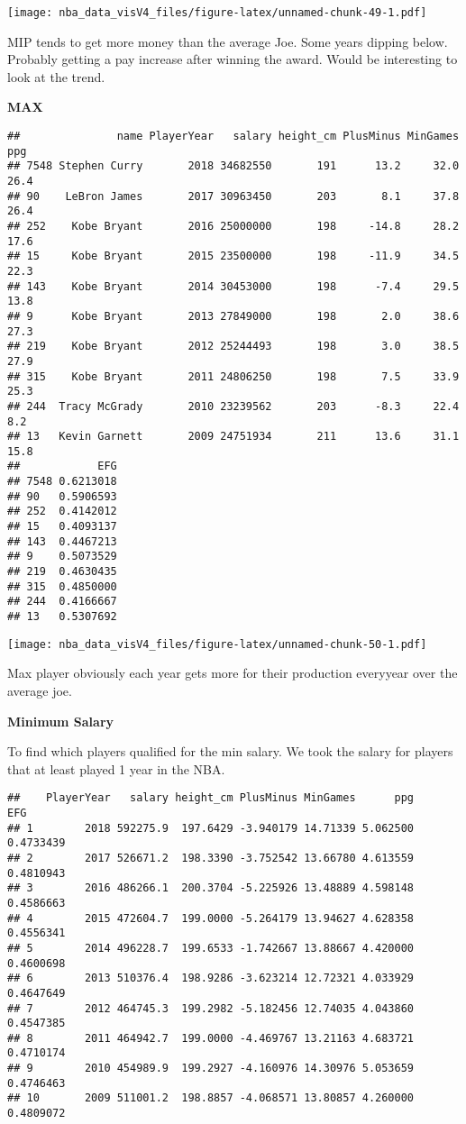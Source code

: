 \documentclass[]{article}
\begin{document}
\texttt{[image: nba\_data\_visV4\_files/figure-latex/unnamed-chunk-49-1.pdf]}

MIP tends to get more money than the average Joe. Some years dipping
below. Probably getting a pay increase after winning the award. Would be
interesting to look at the trend.

\textbf{MAX}

\begin{verbatim}
##               name PlayerYear   salary height_cm PlusMinus MinGames  ppg
## 7548 Stephen Curry       2018 34682550       191      13.2     32.0 26.4
## 90    LeBron James       2017 30963450       203       8.1     37.8 26.4
## 252    Kobe Bryant       2016 25000000       198     -14.8     28.2 17.6
## 15     Kobe Bryant       2015 23500000       198     -11.9     34.5 22.3
## 143    Kobe Bryant       2014 30453000       198      -7.4     29.5 13.8
## 9      Kobe Bryant       2013 27849000       198       2.0     38.6 27.3
## 219    Kobe Bryant       2012 25244493       198       3.0     38.5 27.9
## 315    Kobe Bryant       2011 24806250       198       7.5     33.9 25.3
## 244  Tracy McGrady       2010 23239562       203      -8.3     22.4  8.2
## 13   Kevin Garnett       2009 24751934       211      13.6     31.1 15.8
##            EFG
## 7548 0.6213018
## 90   0.5906593
## 252  0.4142012
## 15   0.4093137
## 143  0.4467213
## 9    0.5073529
## 219  0.4630435
## 315  0.4850000
## 244  0.4166667
## 13   0.5307692
\end{verbatim}

\texttt{[image: nba\_data\_visV4\_files/figure-latex/unnamed-chunk-50-1.pdf]}

Max player obviously each year gets more for their production everyyear
over the average joe.

\textbf{Minimum Salary}

To find which players qualified for the min salary. We took the salary
for players that at least played 1 year in the NBA.

\begin{verbatim}
##    PlayerYear   salary height_cm PlusMinus MinGames      ppg       EFG
## 1        2018 592275.9  197.6429 -3.940179 14.71339 5.062500 0.4733439
## 2        2017 526671.2  198.3390 -3.752542 13.66780 4.613559 0.4810943
## 3        2016 486266.1  200.3704 -5.225926 13.48889 4.598148 0.4586663
## 4        2015 472604.7  199.0000 -5.264179 13.94627 4.628358 0.4556341
## 5        2014 496228.7  199.6533 -1.742667 13.88667 4.420000 0.4600698
## 6        2013 510376.4  198.9286 -3.623214 12.72321 4.033929 0.4647649
## 7        2012 464745.3  199.2982 -5.182456 12.74035 4.043860 0.4547385
## 8        2011 464942.7  199.0000 -4.469767 13.21163 4.683721 0.4710174
## 9        2010 454989.9  199.2927 -4.160976 14.30976 5.053659 0.4746463
## 10       2009 511001.2  198.8857 -4.068571 13.80857 4.260000 0.4809072
\end{verbatim}
\end{document}
